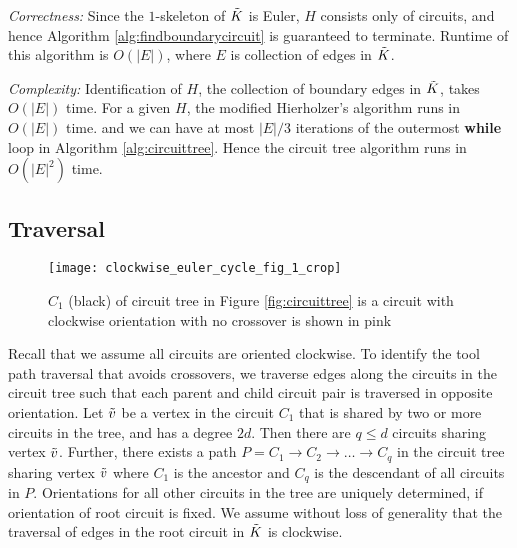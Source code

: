 \emph{Correctness:} Since the $1$-skeleton of $\tilde{K}$ is Euler, $H$ consists only of circuits, and hence Algorithm \ref{alg:findboundarycircuit} is guaranteed to terminate.
Runtime of this algorithm is $O(|E|)$, where $E$ is collection of edges in $\tilde{K}$.

\textit{Complexity:} Identification of $H$, the collection of boundary edges in $\tilde{K}$, takes $O(|E|)$ time.
For a given $H$, the modified Hierholzer's algorithm runs in $O(|E|)$ time.
and we can have at most $|E|/3$ iterations of the outermost {\bfseries while} loop in Algorithm \ref{alg:circuittree}.
Hence the circuit tree algorithm runs in $O(|E|^2)$ time.

%

\subsection{Traversal}\label{subsec:traversal}

\begin{figure}[hbp!] 
  \centering
  \texttt{[image: clockwise\_euler\_cycle\_fig\_1\_crop]}
	\caption{$C_1$ (black) of circuit tree in Figure \ref{fig:circuittree} is a circuit with clockwise orientation with no crossover is shown in pink} 
	\label{fig:clockwiseeulercircuit}
\end{figure} 

Recall that we assume all circuits are oriented clockwise.
To identify the tool path traversal that avoids crossovers, we traverse edges along the circuits in the circuit tree such that each parent and child circuit pair is traversed in opposite orientation.
Let $\tilde{v}$ be a vertex in the circuit $C_1$ that is shared by two or more circuits in the tree, and has a degree $2d$.
Then there are $q \leq d$ circuits sharing vertex $\tilde{v}$.
Further, there exists a path $P = C_1 \to C_2 \to \dots \to C_q$ in the circuit tree sharing vertex $\tilde{v}$ where $C_1$ is the ancestor and $C_q$ is the descendant of all circuits in $P$.
Orientations for all other circuits in the tree are uniquely determined, if orientation of root circuit is fixed.
We assume without loss of generality that the traversal of edges in the root circuit in $\tilde{K}$ is clockwise.

